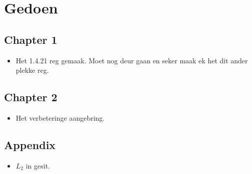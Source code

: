\documentclass[a4paper,10pt]{article}
\begin{document}
\section*{Gedoen}

\subsection{Chapter 1}
\begin{itemize}
	\item Het 1.4.21 reg gemaak. Moet nog deur gaan en seker maak ek het dit ander plekke reg.
\end{itemize}

\subsection{Chapter 2}
\begin{itemize}
	\item Het verbeteringe aangebring.
\end{itemize}

\subsection{Appendix}
\begin{itemize}
	\item $L_2$ in gesit.
\end{itemize}
\end{document}
